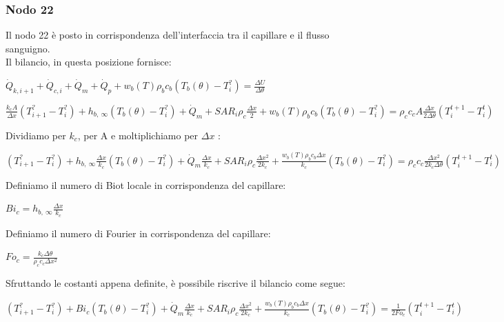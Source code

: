 
\subsubsection*{Nodo 22}
Il nodo 22 è posto in corrispondenza dell'interfaccia tra il capillare e il flusso sanguigno.\\Il bilancio, in questa posizione fornisce:
\begin{center}
	$ \Dot{Q} _{k, i+1} +\Dot{Q} _{c, i}+ \Dot{Q} _{m} +\Dot{Q} _{p}+ w_b (T) \rho _b c_b (T_b(\theta)-T_i ^?)= \frac{\Delta U}{\Delta \theta} $
\end{center}

\vspace{0.1cm}
\begin{center}
	$ \frac{k_{c} A }{\Delta x}(T_{i+1} ^? - T_i ^? ) + h_{b, \:\infty} (T_{b} (\theta) - T_i ^? )+ \Dot{Q} _{m} + SAR_i \rho _{c} \frac{\Delta x}{2}  + w_b (T) \rho _b c_b (T_b(\theta)-T_i ^?) = \rho _{c} c_{c} A \frac{\Delta x}{2 \Delta \theta}(T_i ^{t+1} - T_i ^t )$
\end{center}
Dividiamo per $k_{c}$, per A e moltiplichiamo per $\Delta x$ :
\begin{center}
	$(T_{i+1} ^? - T_i ^? ) + h_{b, \:\infty} \frac{\Delta x }{k_{c}} (T_{b}(\theta) - T_i ^? )+ \Dot{Q} _{m} \frac{\Delta x }{k_{c}}+ SAR_i \rho _{c} \frac{\Delta x^2}{2k_{c}}  + \frac{ w_b (T) \rho _b c_b \Delta x }{k_{c}}(T_b(\theta)-T_i ^?) = \rho _{c} c_{c}\frac{\Delta x^2}{2 k_{c} \Delta \theta}(T_i ^{t+1} - T_i ^t )$
\end{center}
\vspace{0.1cm}
\noindent
Definiamo il numero di Biot locale in corrispondenza del capillare:\\
\begin{center}
	$Bi_{c}= h_{b, \:\infty} \frac{\Delta x }{k_{c}}$
\end{center}
Definiamo il numero di Fourier in corrispondenza del capillare:
\begin{center}
	$Fo_{c}= \frac{k_{c} \Delta \theta}{\rho _{c} c_{c} \Delta x^2}$
\end{center}
Sfruttando le costanti appena definite, è possibile riscrive il bilancio come segue:
\begin{center}
	$(T_{i+1} ^? - T_i ^? ) + Bi_{c} (T_{b}(\theta) - T_i ^? )+ \Dot{Q} _{m} \frac{\Delta x }{k_{c}}+ SAR_i \rho _{c} \frac{\Delta x^2}{2k_{c}}  + \frac{ w_b (T) \rho _b c_b \Delta x }{k_{c}}(T_b(\theta)-T_i ^?) = \frac{1}{2 Fo_{c}}(T_i ^{t+1} - T_i ^t )$
\end{center}
